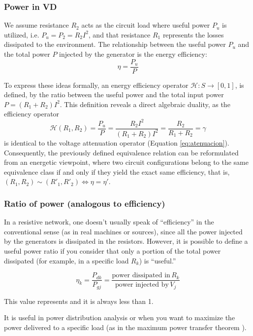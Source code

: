 \documentclass[11pt, a4paper]{article}
\begin{document}
\subsubsection*{Power in VD}

We assume resistance $R_2$ acts as the circuit load where useful power $P_u$ is utilized, i.e. $P_u = P_2 = R_2 I^2$, and that resistance $R_1$ represents the losses dissipated to the environment. The relationship between the useful power $P_u$ and the total power $P$ injected by the generator is the energy efficiency:
\[
 \eta = \frac{P_u}{P}
\]

To express these ideas formally, an energy efficiency operator
$\mathcal{H}: S \to [0, 1]$, is defined, by the ratio between the useful power and
the total input power $P = (R_1 + R_2)I^2$. This definition
reveals a direct algebraic duality, as the efficiency operator
\[ \mathcal{H}(R_1, R_2) = \frac{P_u}{P} = \frac{R_2 I^2}{(R_1 + R_2)I^2} = \frac{R_2}{R_1 + R_2} = \gamma \]
is identical to
the voltage attenuation operator (Equation \ref{eq:atenuacion}). Consequently, the previously defined equivalence relation can be reformulated from an energetic viewpoint, where two circuit configurations belong to the same
equivalence class if and only if they yield the exact same efficiency,
that is, $(R_1, R_2) \sim (R'_1, R'_2) \iff \eta = \eta'$.


\subsubsection*{Ratio of power (analogous to efficiency)}

In a resistive network, one doesn't usually speak of ``efficiency'' in the conventional sense (as in real machines or sources), since all the power injected by the generators is dissipated in the resistors. However, it is possible to define a useful power ratio if you consider that only a portion of the total power dissipated (for example, in a specific load $R_k$) is ``useful.''

\begin{equation}
\eta_k = \frac{P_{dk}}{P_{gj}} =
\frac{\text{power dissipated in}\, R_k}{\text{power injected by}\, V_j}
\label{eq:resistive_network}
\end{equation}

This value represents  and it is always less than 1.

It is useful in power distribution analysis or when you want to maximize the power delivered to a specific load (as in the maximum power transfer theorem \cite{alexander2021fundamentals}).
\end{document}
